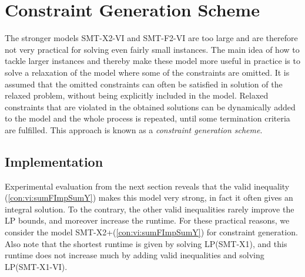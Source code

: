 \newpage
\section{Constraint Generation Scheme}
\label{sec:cg}
The stronger models SMT-X2-VI and SMT-F2-VI are too large and are therefore not very practical for solving even fairly small instances.  The main idea of how to tackle larger instances and thereby make these model more useful in practice is to solve a relaxation of the model where some of the constraints are omitted. It is assumed that the omitted constraints can often be satisfied in solution of the relaxed problem, without being explicitly included in the model. Relaxed constraints that are violated in the obtained solutions can be dynamically added to the model and the whole process is repeated, until some termination criteria are fulfilled. This approach is known as a \emph{constraint generation scheme}.

\subsection{Implementation}%
Experimental evaluation from the next section reveals that the valid inequality (\ref{con:vi:sumFImpSumY}) makes this model very strong, in fact it often gives an integral solution. To the contrary, the other valid inequalities rarely improve the LP bounds, and moreover increase the runtime. For these practical reasons, we consider the model SMT-X2+(\ref{con:vi:sumFImpSumY}) for constraint generation. Also note that the shortest runtime is given by solving LP(SMT-X1), and this runtime does not increase much by adding valid inequalities and solving LP(SMT-X1-VI). 

